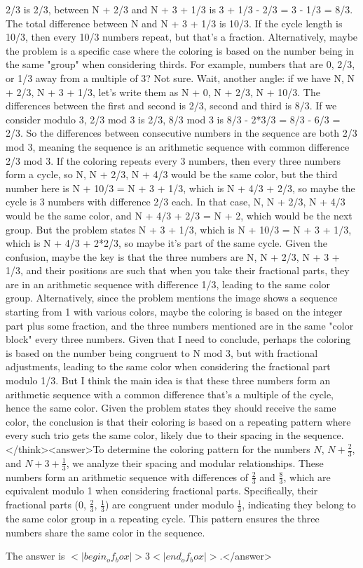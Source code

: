 2/3 is 2/3, between N + 2/3 and N + 3 + 1/3 is 3 + 1/3 - 2/3 = 3 - 1/3 = 8/3. The total difference between N and N + 3 + 1/3 is 10/3. If the cycle length is 10/3, then every 10/3 numbers repeat, but that's a fraction. Alternatively, maybe the problem is a specific case where the coloring is based on the number being in the same "group" when considering thirds. For example, numbers that are 0, 2/3, or 1/3 away from a multiple of 3? Not sure. Wait, another angle: if we have N, N + 2/3, N + 3 + 1/3, let's write them as N + 0, N + 2/3, N + 10/3. The differences between the first and second is 2/3, second and third is 8/3. If we consider modulo 3, 2/3 mod 3 is 2/3, 8/3 mod 3 is 8/3 - 2*3/3 = 8/3 - 6/3 = 2/3. So the differences between consecutive numbers in the sequence are both 2/3 mod 3, meaning the sequence is an arithmetic sequence with common difference 2/3 mod 3. If the coloring repeats every 3 numbers, then every three numbers form a cycle, so N, N + 2/3, N + 4/3 would be the same color, but the third number here is N + 10/3 = N + 3 + 1/3, which is N + 4/3 + 2/3, so maybe the cycle is 3 numbers with difference 2/3 each. In that case, N, N + 2/3, N + 4/3 would be the same color, and N + 4/3 + 2/3 = N + 2, which would be the next group. But the problem states N + 3 + 1/3, which is N + 10/3 = N + 3 + 1/3, which is N + 4/3 + 2*2/3, so maybe it's part of the same cycle. Given the confusion, maybe the key is that the three numbers are N, N + 2/3, N + 3 + 1/3, and their positions are such that when you take their fractional parts, they are in an arithmetic sequence with difference 1/3, leading to the same color group. Alternatively, since the problem mentions the image shows a sequence starting from 1 with various colors, maybe the coloring is based on the integer part plus some fraction, and the three numbers mentioned are in the same "color block" every three numbers. Given that I need to conclude, perhaps the coloring is based on the number being congruent to N mod 3, but with fractional adjustments, leading to the same color when considering the fractional part modulo 1/3. But I think the main idea is that these three numbers form an arithmetic sequence with a common difference that's a multiple of the cycle, hence the same color. Given the problem states they should receive the same color, the conclusion is that their coloring is based on a repeating pattern where every such trio gets the same color, likely due to their spacing in the sequence.</think><answer>To determine the coloring pattern for the numbers \( N \), \( N + \frac{2}{3} \), and \( N + 3 + \frac{1}{3} \), we analyze their spacing and modular relationships. These numbers form an arithmetic sequence with differences of \( \frac{2}{3} \) and \( \frac{8}{3} \), which are equivalent modulo 1 when considering fractional parts. Specifically, their fractional parts (0, \( \frac{2}{3} \), \( \frac{1}{3} \)) are congruent under modulo \( \frac{1}{3} \), indicating they belong to the same color group in a repeating cycle. This pattern ensures the three numbers share the same color in the sequence.  

The answer is \(<|begin_of_box|>3<|end_of_box|>\).</answer>